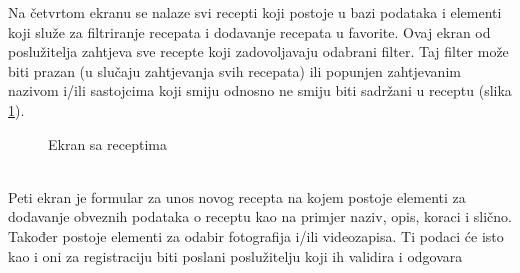 \documentclass[times, utf8, zavrsni]{fer}
\begin{document}
Na četvrtom ekranu se nalaze svi recepti koji postoje u bazi podataka i elementi koji služe za
filtriranje recepata i dodavanje recepata u favorite.
Ovaj ekran od poslužitelja zahtjeva sve recepte koji zadovoljavaju odabrani
filter. Taj filter može biti prazan (u slučaju zahtjevanja svih recepata) ili popunjen zahtjevanim nazivom
i/ili sastojcima koji smiju odnosno ne smiju biti sadržani u receptu (slika \ref*{fig:All recipes}).
\begin{figure}[h]
      \centering
      \caption{Ekran sa receptima}
      \label{fig:All recipes}
\end{figure}\\
Peti ekran je formular za unos novog recepta na kojem postoje elementi za dodavanje
obveznih podataka o receptu kao na primjer naziv, opis, koraci i slično. Također postoje elementi za odabir fotografija i/ili
videozapisa. Ti podaci će isto kao i oni za registraciju biti poslani poslužitelju koji ih validira i odgovara
\end{document}
